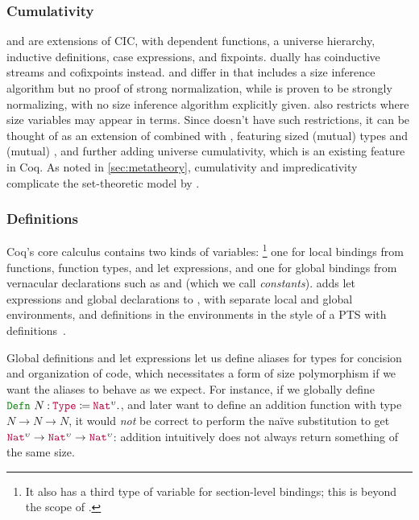 \subsubsection{Cumulativity}\label{sec:overview:comparison}

\CIChat and \CIChatminus are extensions of CIC, with dependent functions, a universe hierarchy, inductive definitions, case expressions, and fixpoints.
\CChatomega dually has coinductive streams and cofixpoints instead.
\CIChat and \CIChatminus differ in that \CIChat includes a size inference algorithm but no proof of strong normalization,
while \CIChatminus is proven to be strongly normalizing, with no size inference algorithm explicitly given.
\CIChatminus also restricts where size variables may appear in terms.
Since \lang doesn't have such restrictions, it can be thought of as an extension of \CIChat combined with \CChatomega,
featuring sized (mutual) \coinductive types and (mutual) \cofixpoints,
and further adding universe cumulativity, which is an existing feature in Coq.
As noted in \autoref{sec:metatheory}, cumulativity and impredicativity complicate the set-theoretic model by \citet{cic-hat-minus}.

\subsubsection{Definitions}

Coq's core calculus contains two kinds of variables:%
\footnote{It also has a third type of variable for section-level bindings;
this is beyond the scope of \lang.}
one for local bindings from functions, function types, and let expressions,
and one for global bindings from vernacular declarations such as  and  (which we call \textit{constants}).
\lang adds let expressions and global declarations to \CIChat,
with separate local and global environments,
and definitions in the environments in the style of a PTS with definitions~\citep{PTSD}.

Global definitions and let expressions let us define aliases for types for concision and organization of code,
which necessitates a form of size polymorphism if we want the aliases to behave as we expect.
For instance, if we globally define $\Defn{N}{\Type{}}{\Nat^\upsilon}$,
and later want to define an addition function with type $N \rightarrow N \rightarrow N$,
it would \emph{not} be correct to perform the na\"ive substitution to get $\Nat^\upsilon \rightarrow \Nat^\upsilon \rightarrow \Nat^\upsilon$:
addition intuitively does not always return something of the same size.

